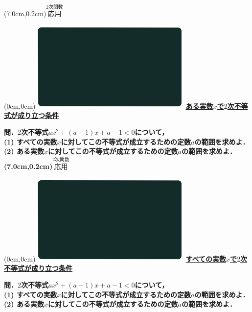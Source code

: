 \documentclass[10pt,
fleqn,
dvipdfmx,
uplatex
]{jsarticle}
\begin{document}
\at(7.0cm,0.2cm){\small\color{bradorange}$\overset{\text{2次関数}}{\text{応用}}$}


\newpage



\at(0cm,0cm){\includegraphics[width=8cm,bb=0 0 1920 1080]{./youtube/thumbnails/templates/smart_background/黒板風.jpeg}}
{\color{orange}\bf\boldmath\large\underline{ある実数$x$で$2$次不等式が成り立つ条件}}\vspace{0.3zw}

\normalsize 
\bf\boldmath 問．$2$次不等式$ax^2+\left(a-1\right)x+a-1<0$について，\\
(1)  すべての実数$x$に対してこの不等式が成立するための定数$a$の範囲を求めよ．\\
(2)  ある実数$x$に対してこの不等式が成立するための定数$a$の範囲を求めよ．\\

\at(7.0cm,0.2cm){\small\color{bradorange}$\overset{\text{2次関数}}{\text{応用}}$}


\newpage



\at(0cm,0cm){\includegraphics[width=8cm,bb=0 0 1920 1080]{./youtube/thumbnails/templates/smart_background/黒板風.jpeg}}
{\color{orange}\bf\boldmath\normalsize\underline{すべての実数$x$で$2$次不等式が成り立つ条件}}\vspace{0.3zw}

\normalsize 
\bf\boldmath 問．$2$次不等式$ax^2+\left(a-1\right)x+a-1<0$について，\\
(1)  すべての実数$x$に対してこの不等式が成立するための定数$a$の範囲を求めよ．\\
(2)  ある実数$x$に対してこの不等式が成立するための定数$a$の範囲を求めよ．\\
\end{document}
